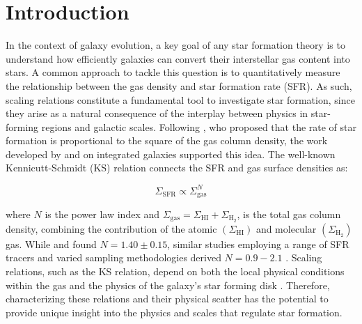 \documentclass[longauth]{aa}
\begin{document}

   \maketitle
%

\section{Introduction}

In the context of galaxy evolution, a key goal of any star formation theory is to understand how efficiently galaxies can convert their interstellar gas content into stars. A common approach to tackle this question is to quantitatively measure the relationship between the gas density and star formation rate (SFR). As such, scaling relations constitute a fundamental tool to investigate star formation, since they arise as a natural consequence of the interplay between physics in star-forming regions and galactic scales. Following \citet{Schmidt1959}, who proposed that the rate of star formation is proportional to the square of the gas column density, the work developed by \citet{Kennicutt1989} and \citet{Kennicutt1998} on integrated galaxies supported this idea. The well-known Kennicutt-Schmidt (KS) relation connects the SFR and gas surface densities as:

\begin{equation}
    \Sigma_{\mathrm{SFR}}\propto\Sigma_{\mathrm{gas}}^N
\end{equation}

\noindent where $N$ is the power law index and $\Sigma_{\mathrm{gas}}=\Sigma_{\mathrm{HI}}+\Sigma_{\mathrm{H}_2}$, is the total gas column density, combining the contribution of the atomic $(\Sigma_{\mathrm{HI}})$ and molecular $(\Sigma_{\mathrm{H}_2})$ gas. While \citet{Kennicutt1989} and \citet{Kennicutt1998} found $N=1.40\pm0.15$, similar studies employing a range of SFR tracers and varied sampling methodologies derived $N=0.9-2.1$ \citep[e.g.,][]{Buat1992,Wong2002,Schuster2007,Kennicutt2007}. Scaling relations, such as the KS relation, depend on both the local physical conditions within the gas and the physics of the galaxy's star forming disk \citep[e.g.,][]{Kennicutt1998,Wong2002}. Therefore, characterizing these relations and their physical scatter has the potential to provide unique insight into the physics and scales that regulate star formation.
\end{document}
